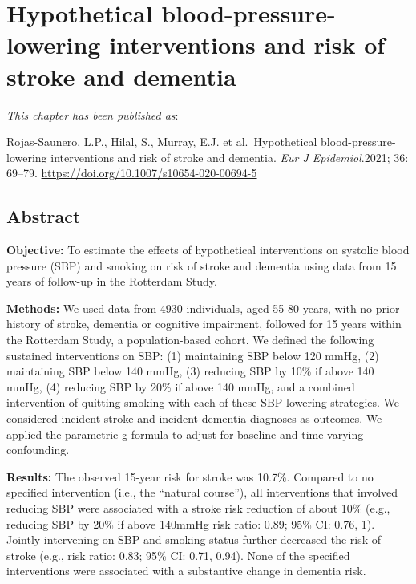 \documentclass[
]{book}
\begin{document}
\hypertarget{chapter3}{%
\chapter{Hypothetical blood-pressure-lowering interventions and risk of stroke and dementia}\label{chapter3}}

\small

\noindent
\emph{This chapter has been published as}:

Rojas-Saunero, L.P., Hilal, S., Murray, E.J. et al.~Hypothetical blood-pressure-lowering interventions and risk of stroke and dementia. \emph{Eur J Epidemiol}.2021; 36: 69--79. \url{https://doi.org/10.1007/s10654-020-00694-5}
\newpage
\normalsize


\newpage

\hypertarget{abstract-1}{%
\section{Abstract}\label{abstract-1}}

\textbf{Objective:} To estimate the effects of hypothetical interventions on systolic blood pressure (SBP) and smoking on risk of stroke and dementia using data from 15 years of follow-up in the Rotterdam Study.

\textbf{Methods:} We used data from 4930 individuals, aged 55-80 years, with no prior history of stroke, dementia or cognitive impairment, followed for 15 years within the Rotterdam Study, a population-based cohort. We defined the following sustained interventions on SBP: (1) maintaining SBP below 120 mmHg, (2) maintaining SBP below 140 mmHg, (3) reducing SBP by 10\% if above 140 mmHg, (4) reducing SBP by 20\% if above 140 mmHg, and a combined intervention of quitting smoking with each of these SBP-lowering strategies. We considered incident stroke and incident dementia diagnoses as outcomes. We applied the parametric g-formula to adjust for baseline and time-varying confounding.

\textbf{Results:} The observed 15-year risk for stroke was 10.7\%. Compared to no specified intervention (i.e., the ``natural course''), all interventions that involved reducing SBP were associated with a stroke risk reduction of about 10\% (e.g., reducing SBP by 20\% if above 140mmHg risk ratio: 0.89; 95\% CI: 0.76, 1). Jointly intervening on SBP and smoking status further decreased the risk of stroke (e.g., risk ratio: 0.83; 95\% CI: 0.71, 0.94). None of the specified interventions were associated with a substantive change in dementia risk.
\end{document}
